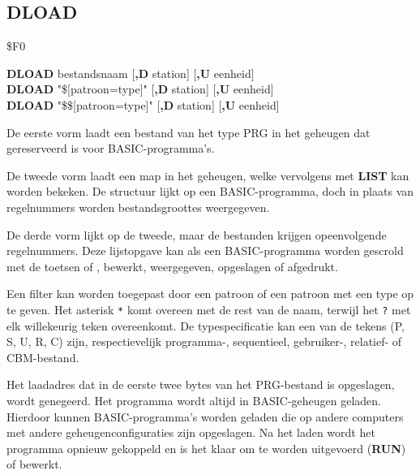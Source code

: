 \subsection{DLOAD}
\begin{description}[leftmargin=2cm,style=nextline]
\item [Token:]    \$F0
\item [Formaat:]   {\bf DLOAD} bestandsnaam [{\bf,D} station] [{\bf,U} eenheid] \\                {\bf DLOAD} "\$[patroon=type]" [{\bf,D} station] [{\bf,U} eenheid] \\                  {\bf DLOAD} "\$\$[patroon=type]" [{\bf,D} station] [{\bf,U} eenheid]

\item [Gebruik:]    De eerste vorm laadt een bestand van het type PRG in het geheugen dat gereserveerd is voor BASIC-programma's.

De tweede vorm laadt een map in het geheugen, welke vervolgens met {\bf LIST} kan worden bekeken. De structuur lijkt op een BASIC-programma, doch in plaats van regelnummers worden bestandsgroottes weergegeven.

                  De derde vorm lijkt op de tweede, maar de bestanden krijgen opeenvolgende regelnummers. Deze lijstopgave kan als een BASIC-programma worden gescrold met de toetsen  of , bewerkt, weergegeven, opgeslagen of afgedrukt.

                  Een filter kan worden toegepast door een patroon of een patroon met een type op te geven. Het asterisk \texttt{*} komt overeen met de rest van de naam, terwijl het \texttt{?} met elk willekeurig teken overeenkomt. De typespecificatie kan een van de tekens (P, S, U, R, C) zijn, respectievelijk programma-, sequentieel, gebruiker-, relatief- of CBM-bestand.

                  \filenamedefinition

                  \drivedefinition

                  \unitdefinition

\item [Opmerkingen:]  Het laadadres dat in de eerste twee bytes van het PRG-bestand is opgeslagen, wordt genegeerd. Het programma wordt altijd in BASIC-geheugen geladen. Hierdoor kunnen BASIC-programma's worden geladen die op andere computers met andere geheugenconfiguraties zijn opgeslagen. Na het laden wordt het programma opnieuw gekoppeld en is het klaar om te worden uitgevoerd ({\bf RUN}) of bewerkt.


\end{description}
